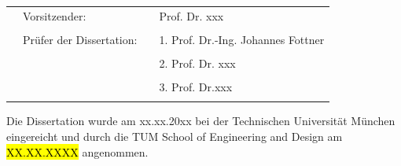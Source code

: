 \begin{titlepage}
\begin{singlespace}
\begin{center}
			\vspace{25pt}
		\end{center}
		\begin{tabular}{p{1.2cm}lll}
			\centering	
			&Vorsitzender:& & Prof. Dr. xxx \\ 
			& & & \\
			&Prüfer der Dissertation: & & 1. Prof. Dr.-Ing. Johannes Fottner\\ 
			&	& & \\
			&	& & 2. Prof. Dr. xxx \\
			&	& & \\
			&	& & 3. Prof. Dr.xxx \\
			&	& & \\ 
		\end{tabular}
		\vspace{48 pt}
		
		Die Dissertation wurde am xx.xx.20xx bei der Technischen Universität München \mbox{eingereicht} und durch die TUM School of Engineering and Design am \hl{XX.XX.XXXX} angenommen.
		
	\end{singlespace}
\end{titlepage}
